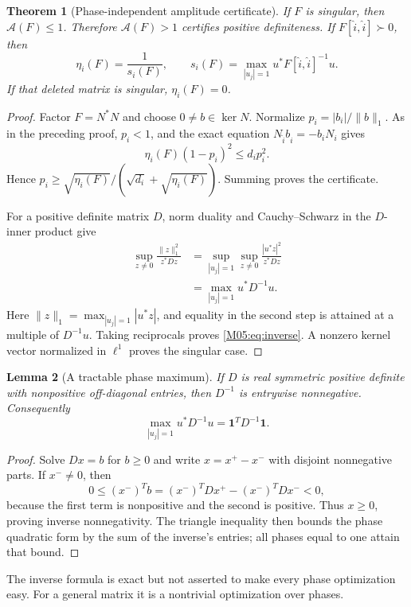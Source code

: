 \documentclass[11pt,a4paper,oneside]{report}
\newtheorem{theorem}{Theorem}[section]
\newtheorem{lemma}[theorem]{Lemma}
\theoremstyle{definition}
\theoremstyle{remark}
\newcommand{\one}{\mathbf 1}
\newcommand{\ABudget}{\mathcal A}
\begin{document}
\begin{theorem}[Phase-independent amplitude certificate]\label{M05:thm:amplitude}
If $F$ is singular, then $\ABudget(F)\le1$. Therefore
$\ABudget(F)>1$ certifies positive definiteness.
If $F[\widehat i,\widehat i]\succ0$, then
\begin{equation}\label{M05:eq:inverse}
 \eta_i(F)=\frac1{s_i(F)},\qquad
 s_i(F)=\max_{|u_j|=1}
 u^*F[\widehat i,\widehat i]^{-1}u .
\end{equation}
If that deleted matrix is singular, $\eta_i(F)=0$.
\end{theorem}
\begin{proof}
Factor $F=N^*N$ and choose $0\ne b\in\ker N$.
Normalize $p_i=|b_i|/\|b\|_1$. As in the preceding proof, $p_i<1$,
and the exact equation
$N_{\widehat i}b_{\widehat i}=-b_iN_i$ gives
\[
 \eta_i(F)(1-p_i)^2\le d_ip_i^2 .
\]
Hence $p_i\ge\sqrt{\eta_i(F)}/(\sqrt{d_i}+\sqrt{\eta_i(F)})$.
Summing proves the certificate.

For a positive definite matrix $D$, norm duality and
Cauchy--Schwarz in the $D$-inner product give
\begin{align*}
 \sup_{z\ne0}\frac{\|z\|_1^2}{z^*Dz}
 &=\sup_{|u_j|=1}\sup_{z\ne0}\frac{|u^*z|^2}{z^*Dz}\\
 &=\max_{|u_j|=1}u^*D^{-1}u .
\end{align*}
Here $\|z\|_1=\max_{|u_j|=1}|u^*z|$, and equality in the second
step is attained at a multiple of $D^{-1}u$. Taking reciprocals
proves \eqref{M05:eq:inverse}. A nonzero kernel vector normalized in
$\ell^1$ proves the singular case.
\end{proof}

\begin{lemma}[A tractable phase maximum]\label{M05:lem:stieltjes}
If $D$ is real symmetric positive definite with nonpositive
off-diagonal entries, then $D^{-1}$ is entrywise nonnegative.
Consequently
\[
 \max_{|u_j|=1}u^*D^{-1}u=\one^TD^{-1}\one.
\]
\end{lemma}
\begin{proof}
Solve $Dx=b$ for $b\ge0$ and write $x=x^+-x^-$ with disjoint
nonnegative parts. If $x^-\ne0$, then
\[
 0\le(x^-)^Tb=(x^-)^TDx^+-(x^-)^TDx^-<0,
\]
because the first term is nonpositive and the second is positive.
Thus $x\ge0$, proving inverse nonnegativity. The triangle inequality
then bounds the phase quadratic form by the sum of the inverse's
entries; all phases equal to one attain that bound.
\end{proof}

The inverse formula is exact but not asserted to make every
phase optimization easy. For a general matrix it is a nontrivial
optimization over phases.
\end{document}
